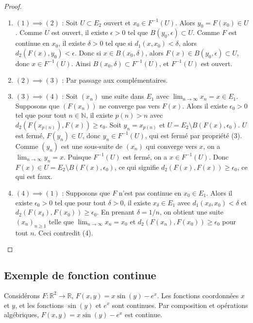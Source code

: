 \documentclass[oneside]{book}
\begin{document}
\begin{proof}
\begin{enumerate}
    \item $(1) \implies (2)$ : Soit $U \subset E_2$ ouvert et $x_0 \in F^{-1}(U)$. Alors $y_0 = F(x_0) \in U$. Comme $U$ est ouvert, il existe $\epsilon > 0$ tel que $B(y_0, \epsilon) \subset U$. Comme $F$ est continue en $x_0$, il existe $\delta > 0$ tel que si $d_1(x, x_0) < \delta$, alors $d_2(F(x), y_0) < \epsilon$. Donc si $x \in B(x_0, \delta)$, alors $F(x) \in B(y_0, \epsilon) \subset U$, donc $x \in F^{-1}(U)$. Ainsi $B(x_0, \delta) \subset F^{-1}(U)$, et $F^{-1}(U)$ est ouvert.

    \item $(2) \implies (3)$ : Par passage aux complémentaires.

    \item $(3) \implies (4)$ : Soit $(x_n)$ une suite dans $E_1$ avec $\lim_{n \to \infty} x_n = x \in E_1$. Supposons que $(F(x_n))$ ne converge pas vers $F(x)$. Alors il existe $\epsilon_0 > 0$ tel que pour tout $n \in \mathbb{N}$, il existe $p(n) > n$ avec $d_2(F(x_{p(n)}), F(x)) \geq \epsilon_0$. Soit $y_n = x_{p(n)}$ et $U = E_2 \setminus B(F(x), \epsilon_0)$. $U$ est fermé, $F(y_n) \in U$, donc $y_n \in F^{-1}(U)$, qui est fermé par propriété (3). Comme $(y_n)$ est une sous-suite de $(x_n)$ qui converge vers $x$, on a $\lim_{n \to \infty} y_n = x$. Puisque $F^{-1}(U)$ est fermé, on a $x \in F^{-1}(U)$. Donc $F(x) \in U = E_2 \setminus B(F(x), \epsilon_0)$, ce qui signifie $d_2(F(x), F(x)) \geq \epsilon_0$, ce qui est faux.

    \item $(4) \implies (1)$ : Supposons que $F$ n'est pas continue en $x_0 \in E_1$. Alors il existe $\epsilon_0 > 0$ tel que pour tout $\delta > 0$, il existe $x_\delta \in E_1$ avec $d_1(x_\delta, x_0) < \delta$ et $d_2(F(x_\delta), F(x_0)) \geq \epsilon_0$. En prenant $\delta = 1/n$, on obtient une suite $(x_n)_{n \geq 1}$ telle que $\lim_{n \to \infty} x_n = x_0$ et $d_2(F(x_n), F(x_0)) \geq \epsilon_0$ pour tout $n$. Ceci contredit (4).
\end{enumerate}
\end{proof}

\subsection{Exemple de fonction continue}

\begin{example}
Considérons $F : \mathbb{R}^2 \to \mathbb{R}$, $F(x, y) = x \sin(y) - e^x$. Les fonctions coordonnées $x$ et $y$, et les fonctions $\sin(y)$ et $e^x$ sont continues. Par composition et opérations algébriques, $F(x, y) = x \sin(y) - e^x$ est continue.
\end{example}
\end{document}
